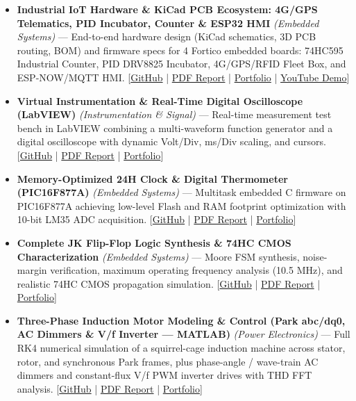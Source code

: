 \documentclass[10pt,a4paper]{article}
\begin{document}
\begin{itemize}
\item \textbf{Industrial IoT Hardware \& KiCad PCB Ecosystem: 4G/GPS Telematics, PID Incubator, Counter \& ESP32 HMI} \textit{(Embedded Systems)} --- End-to-end hardware design (KiCad schematics, 3D PCB routing, BOM) and firmware specs for 4 Fortico embedded boards: 74HC595 Industrial Counter, PID DRV8825 Incubator, 4G/GPS/RFID Fleet Box, and ESP-NOW/MQTT HMI. [\href{https://github.com/scidelo-andriasahy/esp32-industrial-iot-pcb-kicad}{GitHub} | \href{https://scidelo-andriasahy.github.io/assets/pdfs/Schema_KiCad_Smart_Count_ESP32.pdf}{PDF Report} | \href{https://scidelo-andriasahy.github.io/?project=5}{Portfolio} | \href{https://youtu.be/-a-3MGmodos}{YouTube Demo}]
\item \textbf{Virtual Instrumentation \& Real-Time Digital Oscilloscope (LabVIEW)} \textit{(Instrumentation \& Signal)} --- Real-time measurement test bench in LabVIEW combining a multi-waveform function generator and a digital oscilloscope with dynamic Volt/Div, ms/Div scaling, and cursors. [\href{https://github.com/scidelo-andriasahy/labview-virtual-oscilloscope-instrumentation}{GitHub} | \href{https://scidelo-andriasahy.github.io/assets/pdfs/RAPPORT_LABVIEW.pdf}{PDF Report} | \href{https://scidelo-andriasahy.github.io/?project=6}{Portfolio}]
\item \textbf{Memory-Optimized 24H Clock \& Digital Thermometer (PIC16F877A)} \textit{(Embedded Systems)} --- Multitask embedded C firmware on PIC16F877A achieving low-level Flash and RAM footprint optimization with 10-bit LM35 ADC acquisition. [\href{https://github.com/scidelo-andriasahy/pic16f877a-clock-thermometer-optimized}{GitHub} | \href{https://scidelo-andriasahy.github.io/assets/pdfs/RAPPORT_H24_THERMO.pdf}{PDF Report} | \href{https://scidelo-andriasahy.github.io/?project=7}{Portfolio}]
\item \textbf{Complete JK Flip-Flop Logic Synthesis \& 74HC CMOS Characterization} \textit{(Embedded Systems)} --- Moore FSM synthesis, noise-margin verification, maximum operating frequency analysis (10.5 MHz), and realistic 74HC CMOS propagation simulation. [\href{https://github.com/scidelo-andriasahy/jk-flipflop-cmos-74hc-synthesis}{GitHub} | \href{https://scidelo-andriasahy.github.io/assets/pdfs/Rapport_Bascule_JK_CMOS_EN.pdf}{PDF Report} | \href{https://scidelo-andriasahy.github.io/?project=8}{Portfolio}]
\item \textbf{Three-Phase Induction Motor Modeling \& Control (Park abc/dq0, AC Dimmers \& V/f Inverter --- MATLAB)} \textit{(Power Electronics)} --- Full RK4 numerical simulation of a squirrel-cage induction machine across stator, rotor, and synchronous Park frames, plus phase-angle / wave-train AC dimmers and constant-flux V/f PWM inverter drives with THD FFT analysis. [\href{https://github.com/scidelo-andriasahy/induction-motor-control-park-inverter-matlab}{GitHub} | \href{https://scidelo-andriasahy.github.io/assets/pdfs/Rapport_Commande_Machine_Asynchrone_EN.pdf}{PDF Report} | \href{https://scidelo-andriasahy.github.io/?project=9}{Portfolio}]

\end{itemize}
\end{document}
